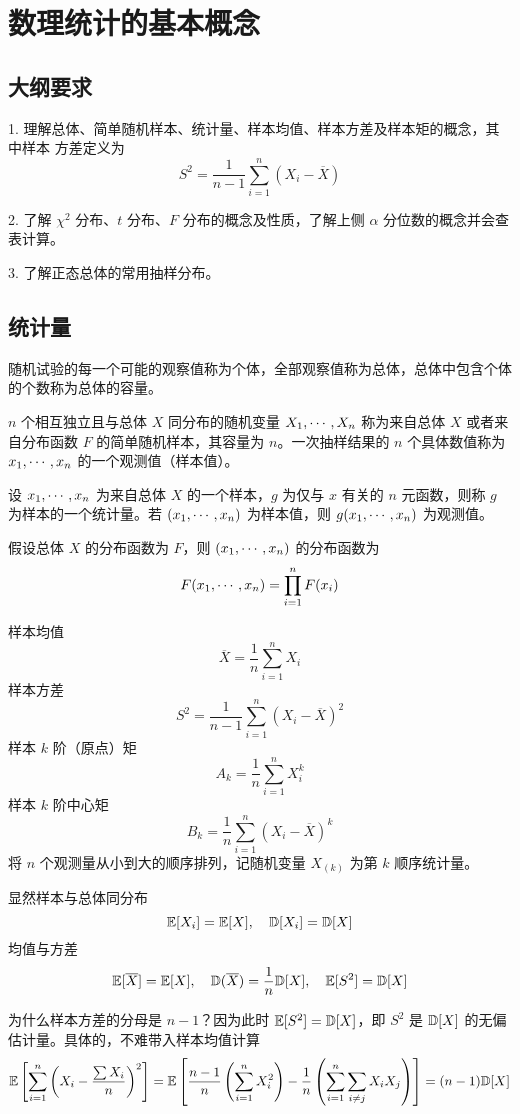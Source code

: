 \section{数理统计的基本概念}

\subsection{大纲要求}

1. 理解总体、简单随机样本、统计量、样本均值、样本方差及样本矩的概念，其中样本
方差定义为
\[ S^2 = \frac{1}{n-1} \sum_{i=1}^n (X_i - \overline{X}) \]

2. 了解 $\chi^2$ 分布、$t$ 分布、$F$ 分布的概念及性质，了解上侧 $\alpha$ 分位数的概念并会查表计算。

3. 了解正态总体的常用抽样分布。

\subsection{统计量}

随机试验的每一个可能的观察值称为个体，全部观察值称为总体，总体中包含个体的个数称为总体的容量。

$n$ 个相互独立且与总体 $X$ 同分布的随机变量 $X_1,\cdots,X_n$ 称为来自总体 $X$ 或者来自分布函数 $F$ 的简单随机样本，其容量为 $n$。一次抽样结果的 $n$ 个具体数值称为 $x_1,\cdots,x_n$ 的一个观测值（样本值）。

设 $x_1,\cdots,x_n$ 为来自总体 $X$ 的一个样本，$g$ 为仅与 $x$ 有关的 $n$ 元函数，则称 $g$ 为样本的一个统计量。若 $(x_1,\cdots,x_n)$ 为样本值，则 $g(x_1,\cdots,x_n)$ 为观测值。

假设总体 $X$ 的分布函数为 $F$，则 $(x_1,\cdots,x_n)$ 的分布函数为
\[ F(x_1,\cdots,x_n) = \prod_{i=1}^n F(x_i) \]

样本均值
\[ \overline{X} = \frac{1}{n} \sum_{i=1}^n X_i \]
样本方差
\[ S^2 = \frac{1}{n-1} \sum_{i=1}^n (X_i - \overline{X})^2 \]
样本 $k$ 阶（原点）矩
\[ A_k = \frac{1}{n} \sum_{i=1}^n X_i^k \]
样本 $k$ 阶中心矩
\[ B_k = \frac{1}{n} \sum_{i=1}^n (X_i - \overline{X})^k \]
将 $n$ 个观测量从小到大的顺序排列，记随机变量 $X_{(k)}$ 为第 $k$ 顺序统计量。

显然样本与总体同分布
\[ \mathbb{E}[X_i] = \mathbb{E} [X], \quad \mathbb{D}[X_i] = \mathbb{D}[X] \]
均值与方差
\[ \mathbb{E}[\overline{X}] = \mathbb{E} [X], \quad \mathbb{D}(\overline{X}) = \frac{1}{n} \mathbb{D} [X], \quad \mathbb{E}[S^2] = \mathbb{D} [X]  \]

\begin{note}
	为什么样本方差的分母是 $n-1$？因为此时 $\mathbb{E}[S^2] = \mathbb{D} [X]$，即 $S^2$ 是 $\mathbb{D}[X]$ 的无偏估计量。具体的，不难带入样本均值计算
	\[ \mathbb{E}\left[\sum_{i=1}^n \left(X_i - \frac{\sum X_i}{n}\right)^2\right]
		= \mathbb{E}\left[  \frac{n-1}{n} \left(\sum_{i=1}^n X_i^2\right) - \frac{1}{n}
			\left(\sum_{i=1}^{n} \sum_{i \neq j} X_iX_j\right) \right]
		= (n-1) \mathbb{D}[X] \]
\end{note}

